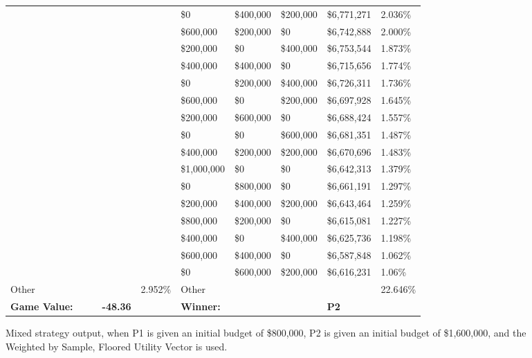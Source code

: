 \documentclass[11pt]{article}
\begin{document}
\begin{figure}
\begin{tabular}{ |p{1.0cm}p{1.0cm}p{1.0cm}p{2.0cm}|p{1.0cm}||p{1.0cm}p{1.0cm}p{1.0cm}p{2.0cm}|p{1.0cm}|}
&&&&&\$0 & \$400,000 & \$200,000 & \$6,771,271 & 2.036\% \\
&&&&&\$600,000 & \$200,000 & \$0 & \$6,742,888 & 2.000\% \\
&&&&&\$200,000 & \$0 & \$400,000 & \$6,753,544 & 1.873\% \\
&&&&&\$400,000 & \$400,000 & \$0 & \$6,715,656 & 1.774\% \\
&&&&&\$0 & \$200,000 & \$400,000 & \$6,726,311 & 1.736\% \\
&&&&&\$600,000 & \$0 & \$200,000 & \$6,697,928 & 1.645\% \\
&&&&&\$200,000 & \$600,000 & \$0 & \$6,688,424 & 1.557\% \\
&&&&&\$0 & \$0 & \$600,000 & \$6,681,351 & 1.487\% \\
&&&&&\$400,000 & \$200,000 & \$200,000 & \$6,670,696 & 1.483\% \\
&&&&&\$1,000,000 & \$0 & \$0 & \$6,642,313 & 1.379\% \\
&&&&&\$0 & \$800,000 & \$0 & \$6,661,191 & 1.297\% \\
&&&&&\$200,000 & \$400,000 & \$200,000 & \$6,643,464 & 1.259\% \\
&&&&&\$800,000 & \$200,000 & \$0 & \$6,615,081 & 1.227\% \\
&&&&&\$400,000 & \$0 & \$400,000 & \$6,625,736 & 1.198\% \\
&&&&&\$600,000 & \$400,000 & \$0 & \$6,587,848 & 1.062\% \\
&&&&&\$0 & \$600,000 & \$200,000 & \$6,616,231 & 1.06\% \\
\hline
Other &&&& 2.952\% & Other &&&& 22.646\% \\
\hline
\small \textbf{Game Value:} &&& \small \textbf{-48.36} && \small \textbf{Winner:} &&& \small \textbf{P2}&\\
\hline
\end{tabular}
\caption{Mixed strategy output, when P1 is given an initial budget of \$800,000, P2 is given an initial budget of \$1,600,000, and the Weighted by Sample, Floored Utility Vector is used.}
\label{8v16table.3}
\end{figure}
\end{document}
